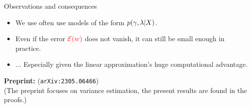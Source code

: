 

\begin{frame}{Observations and consequences}


\begin{minipage}{0.38\textwidth}
    \ElectionData{}
\end{minipage}
\begin{minipage}{0.38\textwidth}
    \ElectionResultsGlobal{}
\end{minipage}


\pause
%
\begin{itemize}
\item We use often use models of the form $p(\gamma, \lambda \vert X)$.
\item Even if the error $\textcolor{red}{\mathcal{E}(w)}$ does not vanish,
      it can still be small enough in practice.
      \item[] ... Especially given the linear approximation's huge computational advantage.
\end{itemize}


\textbf{Preprint: }\citet{giordano:2023:bayesij} (\texttt{arXiv:2305.06466})\\
(The preprint focuses on variance estimation, the present results are found in the proofs.)
    
\end{frame}




\begin{frame}

\footnotesize


\begingroup
\renewcommand{\section}[2]{}%

\endgroup

%
\end{frame}
